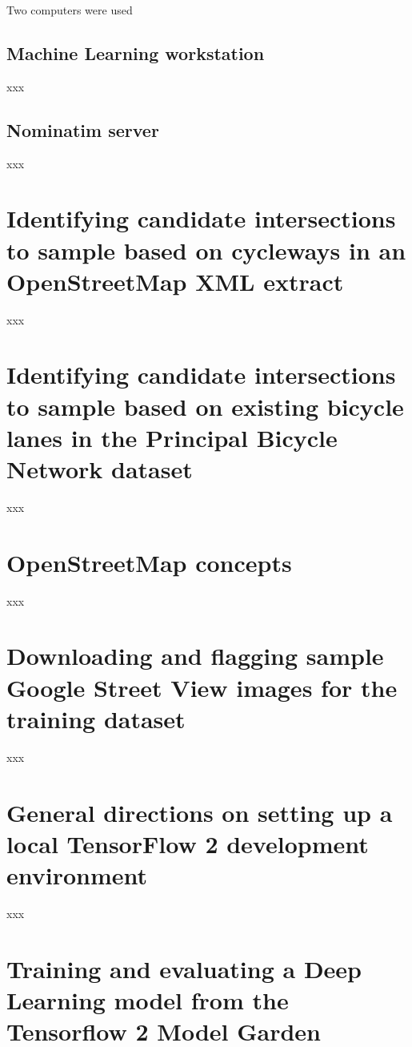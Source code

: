 \documentclass[11pt,twoside]{report}
\begin{document}
Two computers were used

\section{Machine Learning workstation}
\label{a:computer}

xxx

\section{Nominatim server}
\label{a:nominatim}

xxx

\chapter{Identifying candidate intersections to sample based on cycleways in an OpenStreetMap XML extract}
\label{a:sample_osm}

xxx

\chapter{Identifying candidate intersections to sample based on existing bicycle lanes in the Principal Bicycle Network dataset}
\label{a:sample_pbn}

xxx

\chapter{OpenStreetMap concepts}
\label{a:osm_concepts}

xxx

\chapter{Downloading and flagging sample Google Street View images for the training dataset}
\label{a:download_gsv}

xxx

\chapter{General directions on setting up a local TensorFlow 2 development environment}
\label{a:setupenv}

xxx

\chapter{Training and evaluating a Deep Learning model from the Tensorflow 2 Model Garden}
\label{a:tensorflow_training}
\end{document}
